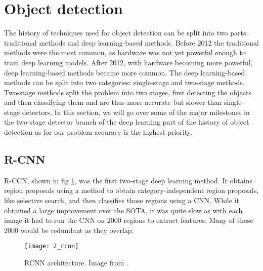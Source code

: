 

\section{Object detection}
The history of techniques used for object detection can be split into two parts: traditional methods and deep learning-based methods. Before 2012 the traditional methods were the most common, as hardware was not yet powerful enough to train deep learning models. After 2012, with hardware becoming more powerful, deep learning-based methods became more common. The deep learning-based methods can be split into two categories: single-stage and two-stage methods. Two-stage methods split the problem into two stages, first detecting the objects and then classifying them and are thus more accurate but slower than single-stage detectors. In this section, we will go over some of the major milestones in the two-stage detector branch of the deep learning part of the history of object detection as for our problem accuracy is the highest priority.

\subsection{R-CNN \cite{rcnn}}
R-CCN, shown in fig \ref{fig:2_rcnn}, was the first two-stage deep learning method. It obtains region proposals using a method to obtain category-independent region proposals, like selective search\cite{selectivesearch}, and then classifies those regions using a CNN. While it obtained a large improvement over the SOTA, it was quite slow as with each image it had to run the CNN on 2000 regions to extract features. Many of those 2000 would be redundant as they overlap.

\begin{figure}[H]
	\centering
	\texttt{[image: 2\_rcnn]}
	\caption{\label{fig:2_rcnn} RCNN architecture. Image from \citet{rcnn}.}
\end{figure}

